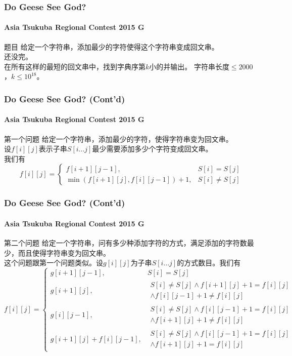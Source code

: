 \documentclass[hyperref={unicode=true}]{beamer}
\theoremstyle{definition}
\theoremstyle{proof}
\begin{document}
\begin{frame}\frametitle{Do Geese See God?}
  \framesubtitle{Asia Tsukuba Regional Contest 2015 G}
  \begin{block}{题目}
    给定一个字符串，添加最少的字符使得这个字符串变成回文串。\\
    \pause{}还没完。\\
    在所有这样的最短的回文串中，找到字典序第$k$小的并输出。
    字符串长度$\leq 2000$，$k \leq 10^{18}$。
  \end{block}
\end{frame}
\begin{frame}\frametitle{Do Geese See God? (Cont'd)}
  \framesubtitle{Asia Tsukuba Regional Contest 2015 G}
  \begin{alertblock}{第一个问题}
    给定一个字符串，添加最少的字符，使得字符串变为回文串。\\
    \pause{}设$f[i][j]$表示子串$S[i\ldots j]$最少需要添加多少个字符变成回文串。\\
    我们有
\[f[i][j]=\begin{cases}
f[i+1][j-1], &S[i]=S[j]\\
\min{(f[i+1][j], f[i][j-1])} + 1, &S[i] \neq S[j]
\end{cases}\]
  \end{alertblock}
\end{frame}
\begin{frame}\frametitle{Do Geese See God? (Cont'd)}
  \framesubtitle{Asia Tsukuba Regional Contest 2015 G}
  \begin{alertblock}{第二个问题}
    给定一个字符串，问有多少种添加字符的方式，满足添加的字符数最少，而且使得字符串变为回文串。\\
    \pause{}这个问题跟第一个问题类似。设$g[i][j]$为子串$S[i \ldots j]$的方式数目。我们有
\[f[i][j]=\begin{cases}
g[i+1][j-1], &S[i] = S[j]\\
g[i+1][j], &\substack{S[i]\neq S[j] \wedge f[i+1][j]+1=f[i][j] \\\wedge f[i][j-1]+1\neq f[i][j]}\\
g[i][j-1], &\substack{S[i] \neq S[j] \wedge f[i][j-1]+1 = f[i][j] \\\wedge f[i+1][j]+1 \neq f[i][j]}\\
g[i+1][j] + f[i][j-1], &\substack{S[i] \neq S[j] \wedge f[i][j-1]+1 = f[i][j] \\\wedge f[i+1][j] +1=f[i][j]}
\end{cases}\]
  \end{alertblock}
\end{frame}
\end{document}
